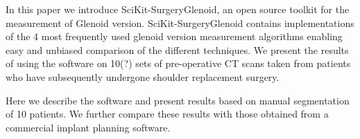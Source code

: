 In this paper we introduce SciKit-SurgeryGlenoid, an open source toolkit for the measurement
of Glenoid version. SciKit-SurgeryGlenoid contains implementations of the 4 most    
frequently used glenoid version measurement algorithms enabling easy and unbiased comparison of
the different techniques. We present the results of using the software on 10(?) sets of
pre-operative CT scans taken from patients who have subsequently undergone shoulder replacement surgery.

Here we describe the software and present results based on manual segmentation of 10
patients. We further compare these results with those obtained from a commercial
implant planning software.


